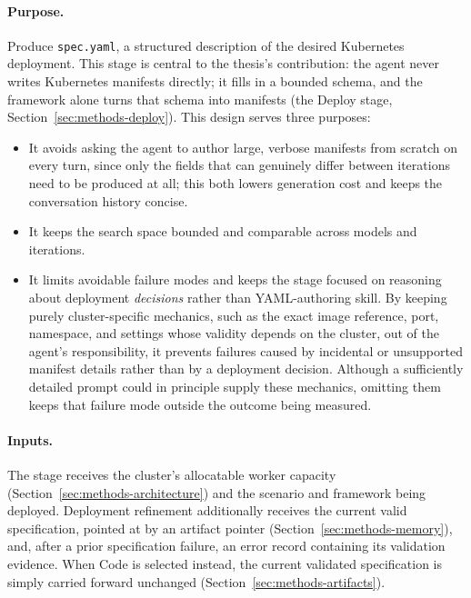 \paragraph{Purpose.}
Produce \texttt{spec.yaml}, a structured description of the desired
Kubernetes deployment. This stage is central to the thesis's contribution:
the agent never writes Kubernetes manifests directly; it fills in a bounded
schema, and the framework alone turns that schema into manifests (the
Deploy stage, Section~\ref{sec:methods-deploy}). This design serves three
purposes:
\begin{itemize}
  \item It avoids asking the agent to author large, verbose manifests from
    scratch on every turn, since only the fields that can genuinely differ
    between iterations need to be produced at all; this both lowers
    generation cost and keeps the conversation history concise.
  \item It keeps the search space bounded and comparable across models and
    iterations.
  \item It limits avoidable failure modes and keeps the stage focused on
    reasoning about deployment \emph{decisions} rather than YAML-authoring
    skill. By keeping purely cluster-specific mechanics, such as the exact
    image reference, port, namespace, and settings whose validity depends on
    the cluster, out of the agent's responsibility, it prevents failures
    caused by incidental or unsupported manifest details rather than by a
    deployment decision. Although a sufficiently detailed prompt could in
    principle supply these mechanics, omitting them keeps that failure mode
    outside the outcome being measured.
\end{itemize}

\paragraph{Inputs.}
The stage receives the cluster's allocatable worker capacity
(Section~\ref{sec:methods-architecture}) and the scenario and framework
being deployed. Deployment refinement additionally receives the current
valid specification, pointed at by an artifact pointer
(Section~\ref{sec:methods-memory}), and, after a prior specification
failure, an error record containing its validation evidence. When Code is
selected instead, the current validated specification is simply carried
forward unchanged (Section~\ref{sec:methods-artifacts}).

